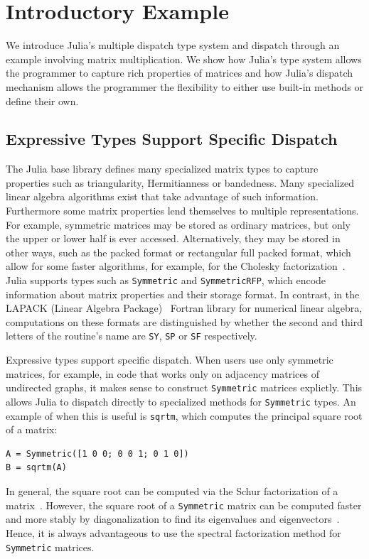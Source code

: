 \section{Introductory Example}

We introduce Julia's multiple dispatch type system and dispatch through an example involving matrix multiplication. We show how Julia's type system allows the programmer to capture rich properties of matrices and how Julia's dispatch mechanism allows the programmer the flexibility to either use built-in methods or define their own.

\subsection{Expressive Types Support Specific Dispatch}
The Julia base library defines
many specialized matrix types to capture properties
such as triangularity, Hermitianness or bandedness. Many specialized
linear algebra algorithms exist that take advantage of such information.
Furthermore some matrix properties lend themselves to multiple representations.
For example, symmetric matrices may be stored as ordinary matrices, but only
the upper or lower half is ever accessed. Alternatively, they may be stored in
other ways, such as the packed format or rectangular full packed format, which
allow for some faster algorithms, for example, for the Cholesky
factorization~\cite{Gustavson2010}.
Julia supports types such as \lstinline|Symmetric| and \lstinline|SymmetricRFP|, which encode information about matrix properties and their storage format.
In contrast, in the LAPACK (Linear Algebra Package)~ Fortran library for numerical linear algebra, computations
on these formats are distinguished by whether the second and third letters of
the routine's name are \lstinline|SY|, \lstinline|SP| or \lstinline|SF|
respectively.

Expressive types support specific dispatch.
When users use only symmetric matrices, for example, in code that
works only on adjacency matrices of undirected graphs,
it makes sense to construct \lstinline|Symmetric| matrices explictly.
This allows Julia to dispatch directly to specialized methods for \lstinline|Symmetric|
types. An example of when this is useful is \lstinline|sqrtm|, which computes the
principal square root of a matrix:
\begin{lstlisting}
A = Symmetric([1 0 0; 0 0 1; 0 1 0])
B = sqrtm(A)
\end{lstlisting}
In general, the square root can be computed
via the Schur factorization of a matrix~\cite{Golub2013}. However, the square
root of a \lstinline|Symmetric| matrix can be computed faster and more stably
by diagonalization to find its eigenvalues and
eigenvectors~\cite{Higham2008,Golub2013}. Hence, it is always advantageous to
use the spectral factorization method for \lstinline|Symmetric| matrices.

